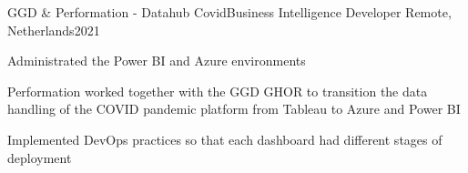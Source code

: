 \resumeProject
  {GGD \& Performation - Datahub Covid}{Business Intelligence Developer}
  {Remote, Netherlands}{2021}
  \resumeItemListStart
\item Administrated the Power BI and Azure environments
\item Performation worked together with the GGD GHOR to transition the data handling of the COVID pandemic platform from Tableau to Azure and Power BI
\item Implemented DevOps practices so that each dashboard had different stages of deployment
  \resumeItemListEnd 
